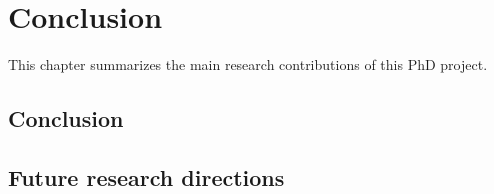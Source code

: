 \chapter{Conclusion}
\label{chap:conclusion}

This chapter summarizes the main research contributions of this PhD project.

\section{Conclusion}
\label{conclusion:conclusion}

\lipsum[1-5]

\section{Future research directions}
\label{conclusion:futurework}

\lipsum[1-5]


